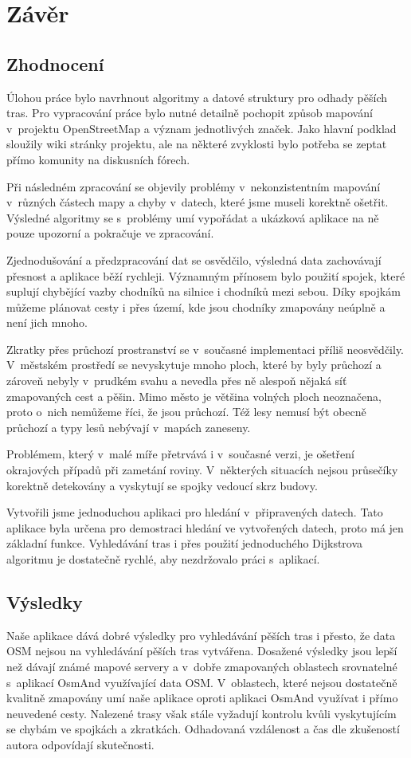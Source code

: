 \chapter{Závěr}

\section{Zhodnocení}
Úlohou práce bylo navrhnout algoritmy a datové struktury pro odhady pěších tras.
Pro vypracování práce bylo nutné detailně pochopit způsob mapování v~projektu
OpenStreetMap a význam jednotlivých značek. Jako hlavní podklad sloužily wiki
stránky projektu, ale na některé zvyklosti bylo potřeba se zeptat přímo komunity na
diskusních fórech. 

Při následném zpracování se objevily problémy v~nekonzistentním mapování
v~různých částech mapy a chyby v~datech, které jsme museli korektně ošetřit.
Výsledné algoritmy se s~problémy umí vypořádat a ukázková aplikace na ně pouze
upozorní a pokračuje ve zpracování. 

Zjednodušování a předzpracování dat se osvědčilo, výsledná data zachovávají
přesnost a aplikace běží rychleji. Významným přínosem bylo použití spojek, které
suplují chybějící vazby chodníků na silnice i chodníků mezi sebou. Díky spojkám
můžeme plánovat cesty i přes území, kde jsou chodníky zmapovány neúplně a není
jich mnoho. 

Zkratky přes průchozí prostranství se v~současné implementaci příliš neosvědčily.
V~městském prostředí se nevyskytuje mnoho ploch, které by byly průchozí a
zároveň nebyly v~prudkém svahu a nevedla přes ně alespoň nějaká síť
zmapovaných cest a pěšin. Mimo město je většina volných ploch neoznačena, proto
o~nich nemůžeme říci, že jsou průchozí. Též lesy nemusí být obecně průchozí a typy lesů
nebývají v~mapách zaneseny. 

Problémem, který v~malé míře přetrvává i v~současné verzi, je ošetření
okrajových případů při zametání roviny. V~některých situacích nejsou
průsečíky korektně detekovány a vyskytují se spojky vedoucí skrz budovy.  

Vytvořili jsme jednoduchou aplikaci pro hledání v~připravených datech. Tato
aplikace byla určena pro demostraci hledání ve vytvořených datech, proto má jen
základní funkce. Vyhledávání tras i přes použití jednoduchého Dijkstrova
algoritmu je dostatečně rychlé, aby nezdržovalo práci s~aplikací. 

\section{Výsledky}
Naše aplikace dává dobré výsledky pro vyhledávání pěších tras i přesto, že data
OSM nejsou na vyhledávání pěších tras vytvářena. Dosažené výsledky jsou lepší
než dávají známé mapové servery a v~dobře zmapovaných oblastech srovnatelné
s~aplikací OsmAnd využívající data OSM. V~oblastech, které nejsou dostatečně
kvalitně zmapovány umí naše aplikace oproti aplikaci OsmAnd využívat i přímo
neuvedené cesty.  Nalezené trasy však stále vyžadují kontrolu kvůli vyskytujícím
se chybám ve spojkách a zkratkách.  Odhadovaná vzdálenost a čas dle zkušeností
autora odpovídají skutečnosti. 


